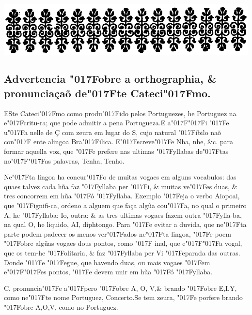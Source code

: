 \documentclass[openany,titlepage,12pt]{book}
\renewcommand{\chaptermark}[1]{\markboth{#1}{}}
\renewcommand{\sectionmark}[1]{\gdef\rightmark{#1}}
\newcommand{\lgS}{\char"017F}
\newcommand{\lgSS}{\char"017F\char"017F}
\begin{document}
\begin{center}
    \vspace*{12pt}
    \includegraphics[scale=0.24]{03-advertencias.png}
\end{center}
\unskip
\subsection{Advertencia \lgS obre a orthographia, \&
pronunciaçaõ de\lgS te Cateci\lgS mo.}


\lettrine[findent=2pt, nindent=0pt, lines=2]
{E}{S}te Cateci\lgS mo como produ\lgS ido pelos\linebreak
Portuguezes, he Portuguez na e\lgS critu-ra; que pode admitir
a pena Portugueza.\linebreak E a\lgSS i \lgS e u\lgS a nelle de
Ç com zeura em lugar do S, cujo natural \lgS ibilo naõ con\lgS
ente a\linebreak lingoa Bra\lgS ilica. E\lgS screve\lgS e Nha,
nhe, \&c. para formar aquella voz, que \lgS e prefere nas 
ultimas \lgS yllabas de\lgS tas no\lgSS as palavras,
Tenha, Tenho.

Ne\lgS ta lingoa ha concur\lgS o de muitas vogaes em alguns
vocabulos: das quaes talvez cada hũa faz \lgS yllaba per
\lgS i, \& muitas ve\lgS es duas, \& tres concorrem em hũa
\lgS ó \lgS yllaba. Exemplo \lgS eja o verbo Aiopoai, que
\lgS ignifi-ca, ordeno a alguem que faça algũa cou\lgS a,
no qual o primeiro A, he \lgS yllaba: Io, outra: \& as tres
ultimas vogaes fazem outra \lgS ylla-ba, na qual O, he liquido,
AI, diphtongo. Para \lgS e evitar a duvida, que ne\lgS ta
parte podem padecer os menos ver\lgS ados ne\lgS ta lingoa,
\lgS e poem \lgS obre algũas vogaes dous pontos, como \lgS 
inal, que e\lgSS a vogal, que os tem-he \lgS olitaria, \&
faz \lgS yllaba per Vi \lgS eparada das outras. Donde \lgS e
\lgS egue, que havendo duas, ou mais vogaes \lgS em
e\lgSS es pontos, \lgS e devem unir em hũa \lgS ó \lgS yllaba.

\chaptermark{Advertencia.}
\sectionmark{Advertencia.}

C, pronuncia\lgS e a\lgS pero \lgS obre A, O, V,\& brando
\lgS obre E,I,Y, como ne\lgS te nome Portuguez, 
Concerto.Se tem zeura, \lgS e porfere brando \lgS obre
A,O,V, como no Portuguez.
\end{document}
